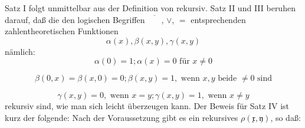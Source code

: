 \documentclass[draft]{scrartcl}
\newcounter{commentaryNumber}
\begin{document}
Satz I folgt unmittelbar aus der Definition von \glqq rekursiv\grqq. Satz II und III beruhen darauf, daß die den logischen Begriffen $\overline{\phantom{XX}}$, $\lor$, $=$ entsprechenden zahlentheoretischen Funktionen
\begin{equation*}
	\alpha\left(x\right), \beta\left(x, y\right), \gamma\left(x, y\right)
\end{equation*}
nämlich:
\begin{equation*}
	\alpha\left(0\right) = 1; \alpha\left(x\right) = 0\text{ für } x \not = 0
\end{equation*}

\begin{equation*}
	\beta\left(0, x\right) = \beta\left(x, 0\right) = 0; \beta\left(x, y\right) = 1,
	\text{ wenn } x, y \text{ beide } \not = 0 \text{ sind}
\end{equation*}

\begin{equation*}
	\gamma\left(x, y\right) = 0, \text{ wenn } x = y; \gamma\left(x, y\right) = 1, \text{ wenn } x \not = y
\end{equation*}
rekursiv sind, wie man sich leicht überzeugen kann. Der
Beweis für Satz IV ist kurz der folgende: Nach der 
Voraussetzung gibt es ein rekursives $\rho\left(\mathfrak{x}, \mathfrak{y}\right)$, so daß:
\end{document}
